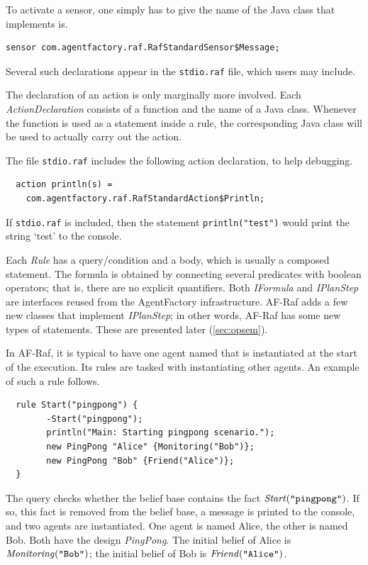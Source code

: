 \documentclass[a4paper,12pt,oneside,fleqn]{book} %
\begin{document}
\begin{example}
To activate a sensor, one simply has to give the name of the Java class
that implements is.
\begin{verbatim}
sensor com.agentfactory.raf.RafStandardSensor$Message;
\end{verbatim}
Several such declarations appear in the {\tt stdio.raf} file, which users
may include.
\end{example}

The declaration of an action is only marginally more involved.  Each
{\it ActionDeclaration\/} consists of a function and the name of a Java
class. Whenever the function is used as a statement inside a rule, the
corresponding Java class will be used to actually carry out the action.

\begin{example}
The file {\tt stdio.raf} includes the following action declaration, to help
debugging.
\begin{verbatim}
  action println(s) =
    com.agentfactory.raf.RafStandardAction$Println;
\end{verbatim}
If {\tt stdio.raf} is included, then the statement {\tt println("test")}
would print the string `test' to the console.
\end{example}

Each {\it Rule\/} has a query\slash condition and a body, which is usually
a composed statement. The formula is obtained by connecting several
predicates with boolean operators; that is, there are no explicit
quantifiers. Both {\it IFormula\/} and {\it IPlanStep\/} are interfaces
reused from the AgentFactory infrastructure. AF-Raf adds a few new classes
that implement {\it IPlanStep\/}; in other words, AF-Raf has some new
types of statements. These are presented later (\autoref{sec:opsem}).

\begin{example}
In AF-Raf, it is typical to have one agent named that is instantiated at
the start of the execution. Its rules are tasked with instantiating other
agents. An example of such a rule follows.
\begin{verbatim}
  rule Start("pingpong") {
        -Start("pingpong");
        println("Main: Starting pingpong scenario.");
        new PingPong "Alice" {Monitoring("Bob")};
        new PingPong "Bob" {Friend("Alice")};
  }
\end{verbatim}
The query checks whether the belief base contains the fact ${\it
Start}(\text{\tt``pingpong''})$. If so, this fact is removed from the
belief base, a message is printed to the console, and two agents are
instantiated. One agent is named Alice, the other is named Bob. Both have
the design {\it PingPong}. The initial belief of Alice is ${\it
Monitoring}(\text{\tt ``Bob''})$; the initial belief of Bob is ${\it
Friend}(\text{\tt``Alice''})$.
\end{example}
\end{document}

